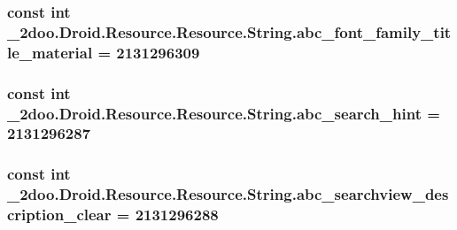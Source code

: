 \hypertarget{class__2doo_1_1_droid_1_1_resource_1_1_string_65086826385cb9e415be430e77c969f5}{
\subsubsection[{abc\_\-font\_\-family\_\-title\_\-material}]{\setlength{\rightskip}{0pt plus 5cm}const int \_\-2doo.Droid.Resource.Resource.String.abc\_\-font\_\-family\_\-title\_\-material = 2131296309}}
\label{class__2doo_1_1_droid_1_1_resource_1_1_string_65086826385cb9e415be430e77c969f5}


\hypertarget{class__2doo_1_1_droid_1_1_resource_1_1_string_2c484437c625418d4adcb03b43192331}{
\subsubsection[{abc\_\-search\_\-hint}]{\setlength{\rightskip}{0pt plus 5cm}const int \_\-2doo.Droid.Resource.Resource.String.abc\_\-search\_\-hint = 2131296287}}
\label{class__2doo_1_1_droid_1_1_resource_1_1_string_2c484437c625418d4adcb03b43192331}


\hypertarget{class__2doo_1_1_droid_1_1_resource_1_1_string_18d93ab2ac92cce4997bfc2871e0071f}{
\subsubsection[{abc\_\-searchview\_\-description\_\-clear}]{\setlength{\rightskip}{0pt plus 5cm}const int \_\-2doo.Droid.Resource.Resource.String.abc\_\-searchview\_\-description\_\-clear = 2131296288}}
\label{class__2doo_1_1_droid_1_1_resource_1_1_string_18d93ab2ac92cce4997bfc2871e0071f}



